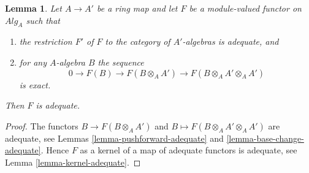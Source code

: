 \documentclass{stacks-project}
\theoremstyle{plain}
\newtheorem{lemma}[subsection]{Lemma}
\theoremstyle{definition}
\theoremstyle{remark}
\numberwithin{equation}{subsection}
\begin{document}
\begin{lemma}
\label{lemma-adequate-descent}
Let $A \to A'$ be a ring map and let $F$ be a module-valued functor on
$\textit{Alg}_A$ such that
\begin{enumerate}
\item the restriction $F'$ of $F$ to the category of $A'$-algebras is
adequate, and
\item for any $A$-algebra $B$ the sequence
$$
0 \to F(B) \to F(B \otimes_A A') \to F(B \otimes_A A' \otimes_A A')
$$
is exact.
\end{enumerate}
Then $F$ is adequate.
\end{lemma}

\begin{proof}
The functors $B \to F(B \otimes_A A')$ and
$B \mapsto F(B \otimes_A A' \otimes_A A')$ are adequate, see
Lemmas \ref{lemma-pushforward-adequate} and
\ref{lemma-base-change-adequate}.
Hence $F$ as a kernel of a map of adequate functors is adequate, see
Lemma \ref{lemma-kernel-adequate}.
\end{proof}
\end{document}
